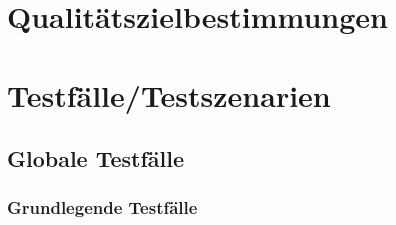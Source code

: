 \documentclass[a4paper,12pt]{article}
\begin{document}
\section{Qualitätszielbestimmungen}

\begin{comment}

\begin{minipage}[t]{\linewidth}
\item[FA00] \textbf{<Titel>}
\subitem \textbf{Erklärung} <Was soll getestet werden>
\subitem \textbf{Ablauf} <Vorbedingung/Startzustand>
<Eine Sequenz von Aktionen und Zwischenzuständen>
<Nachbedingung/Endzustand>
<Alle Zustände können auch wegfallen>
\end{minipage}
\pagebreak

\end{comment}

\section{Testfälle/Testszenarien}
\subsection{Globale Testfälle}
\subsubsection{Grundlegende Testfälle}
\end{document}
